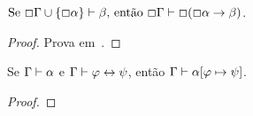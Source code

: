     \begin{theorem}
        $\text{Se }\Box\Gamma\cup\left\{\Box\alpha\right\}\vdash\beta\text{, então }\Box\Gamma\vdash\Box(\Box\alpha\to\beta)$.

        \begin{proof}
            Prova em~\cite{Marcus}.
        \end{proof}
    \end{theorem}

    \begin{theorem}\label{replacement}
        Se $\Gamma\mathrel{\vdash}\alpha$ e $\Gamma\mathrel{\vdash}\varphi\leftrightarrow\psi$, então $\Gamma\mathrel{\vdash}\alpha[\varphi\mapsto\psi]$.

        \begin{proof}
            
        \end{proof}
    \end{theorem}
